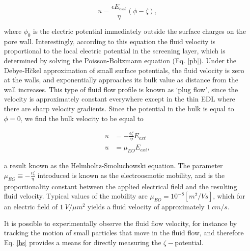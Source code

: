 			\[ u=\frac{\epsilon E_{ext}}{\eta}\left(\phi-\zeta\right), \]
			
			where $\phi_{0}$ is the electric potential immediately outside the surface charges on the pore wall. Interestingly, according to this equation the fluid velocity is proportional to the local electric potential in the screening layer, which is determined by solving the Poisson-Boltzmann equation (Eq. \ref{pb}). Under the Debye-H\u ckel approximation of small surface potentials, the fluid velocity is zero at the walls, and exponentially approaches its bulk value as distance from the wall increases. This type of fluid flow profile is known as `plug flow', since the velocity is approximately constant everywhere except in the thin EDL where there are sharp velocity gradients. Since the potential in the bulk is equal to $\phi=0$, we find the bulk velocity to be equal to 
			
			\begin{equation} \label{eq:hs}
				\begin{split}
					u &= -\frac{\epsilon\zeta}{\eta}E_{ext} \\
					u &= \mu_{EO}E_{ext},
				\end{split}
			\end{equation}
			
			a result known as the Helmholtz-Smoluchowski equation. The parameter $\mu_{EO}\equiv-\frac{\epsilon\zeta}{\eta}$ introduced is known as the electroosmotic mobility, and is the proportionality constant between the applied electrical field and the resulting fluid velocity. Typical values of the mobility are $\mu_{EO}=10^{-8} \left[m^{2}/V s\right]$, which for an electric field of $\SI{1}{V/\mu m^{2}}$ yields a fluid velocity of approximately $\SI{1}{cm/s}$.
			
			It is possible to experimentally observe the fluid flow velocity, for instance by tracking the motion of small particles that move in the fluid flow, and therefore Eq. \ref{hs} provides a means for directly measuring the $\zeta-$potential.
			
			

			
			
			

			

			
			
			

			
			
			
			

			
			


			
	





